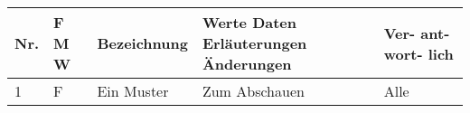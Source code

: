 \begin{center}
\begin{tabular}{|p{1cm}|p{0.5cm}|p{5cm}|p{5cm}|p{1.5cm}|}\hline
\textbf{Nr.} & \textbf{F M W} & \textbf{Bezeichnung} & \textbf{Werte Daten Erläuterungen Änderungen} & \textbf{Ver- ant- wort- lich}\\\hline
 1 & F & Ein Muster & Zum Abschauen & Alle\\ \hline
\end{tabular}
\end{center}